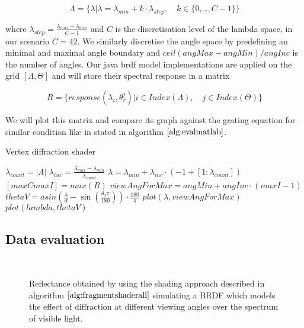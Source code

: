 \begin{equation}
\Lambda = \{\lambda | \lambda = \lambda_{min} + k \cdot \lambda_{step}, \quad k \in \{0,..,C-1\}\}
\label{eq:lambdaspacesetup}
\end{equation}

where $\lambda_{step} = \frac{\lambda_{max}-\lambda_{min}}{C-1}$ and $C$ is the discretisation level of the lambda space, in our scenario $C = 42$. We similarly discretise the angle space by predefining an minimal and maximal angle boundary and $ceil(angMax - angMin) / angInc$ is the number of angles. Our java brdf model implementations are applied on the grid $[\Lambda, \Theta]$ and will store their spectral response in a matrix

\begin{equation} 
R = \{response(\lambda_i, \theta_{r}^{j}) | i \in Index(\Lambda), \quad j \in Index(\Theta)\}
\label{eq:responsematrix}
\end{equation}

We will plot this matrix and compare its graph against the grating equation for similar condition like in stated in algorithm $\ref{alg:evalmatlab}$.

\begin{algorithm}[H]
  \caption{Vertex diffraction shader}
  \begin{algorithmic}
    \State $ \lambda_{count} = |\Lambda| $
    \State $ \lambda_{inc} = \frac{\lambda_{max}-\lambda_{min}}{\lambda_{count}}$
    \State $ \lambda = \lambda_{min} + \lambda_{inc} \cdot (-1+[1:\lambda_{count}])$
    \State $ [maxC maxI] = max(R)$
    \State $ viewAngForMax = angMin + angInc \cdot (maxI-1)$
    \State $ thetaV = asin \left( \frac{\lambda}{d} - \sin \left(  \frac{\theta_I \pi}{180} \right) \right) \cdot \frac{180}{\pi}$
    \State $ plot(\lambda, viewAngForMax)$
    \State $ plot(lambda, thetaV)$
  \end{algorithmic}
\label{alg:evalmatlab}
\end{algorithm}

\subsection{Data evaluation}

\begin{figure}[H]
  \centering
~
~

  \caption{Reflectance obtained by using the shading approach described in algorithm $\ref{alg:fragmentshaderall}$ simulating a BRDF which models the effect of diffraction at different viewing angles over the spectrum of visible light.}

\label{fig:evaluationdiffshaderalllambda}
\end{figure}

